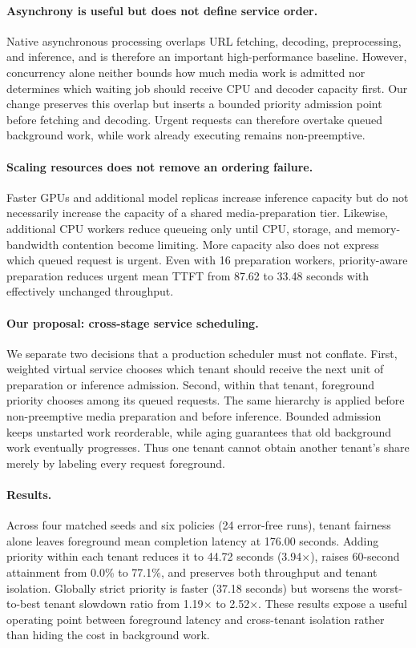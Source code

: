 \documentclass[sigconf,review,anonymous]{acmart}
\begin{document}
\paragraph{Asynchrony is useful but does not define service order.}
Native asynchronous processing overlaps URL fetching, decoding,
preprocessing, and inference, and is therefore an important high-performance
baseline. However, concurrency alone neither bounds how much media work is
admitted nor determines which waiting job should receive CPU and decoder
capacity first. Our change preserves this overlap but inserts a bounded
priority admission point before fetching and decoding. Urgent requests can
therefore overtake queued background work, while work already executing
remains non-preemptive.

\paragraph{Scaling resources does not remove an ordering failure.}
Faster GPUs and additional model replicas increase inference capacity but do
not necessarily increase the capacity of a shared media-preparation tier.
Likewise, additional CPU workers reduce queueing only until CPU, storage, and
memory-bandwidth contention become limiting. More capacity also does not
express which queued request is urgent. Even with 16 preparation workers,
priority-aware preparation reduces urgent mean TTFT from 87.62 to 33.48
seconds with effectively unchanged throughput.

\paragraph{Our proposal: cross-stage service scheduling.}
We separate two decisions that a production scheduler must not conflate.
First, weighted virtual service chooses which tenant should receive the next
unit of preparation or inference admission. Second, within that tenant,
foreground priority chooses among its queued requests. The same hierarchy is
applied before non-preemptive media preparation and before inference. Bounded
admission keeps unstarted work reorderable, while aging guarantees that old
background work eventually progresses. Thus one tenant cannot obtain another
tenant's share merely by labeling every request foreground.

\paragraph{Results.}
Across four matched seeds and six policies (24 error-free runs), tenant
fairness alone leaves foreground mean completion latency at 176.00 seconds.
Adding priority within each tenant reduces it to 44.72 seconds
(3.94$\times$), raises 60-second attainment from 0.0\% to 77.1\%, and
preserves both throughput and tenant isolation. Globally strict priority is
faster (37.18 seconds) but worsens the worst-to-best tenant slowdown ratio
from 1.19$\times$ to 2.52$\times$. These results expose a useful operating
point between foreground latency and cross-tenant isolation rather than
hiding the cost in background work.
\end{document}
